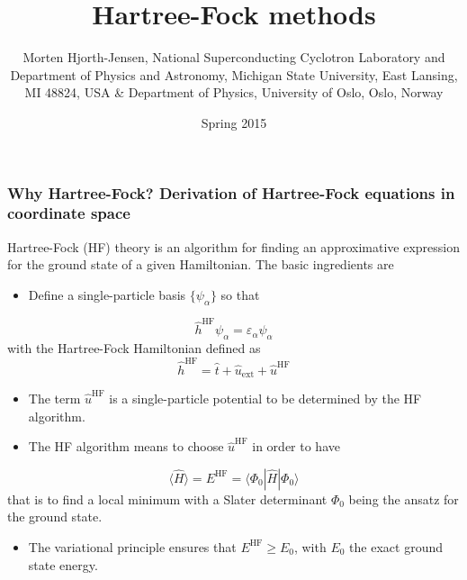 \documentclass{beamer}
\begin{document}




\title{Hartree-Fock methods}


\author{Morten Hjorth-Jensen, National Superconducting Cyclotron Laboratory and Department of Physics and Astronomy, Michigan State University, East Lansing, MI 48824, USA {\&} Department of Physics, University of Oslo, Oslo, Norway\inst{}}
\institute{}

\date{Spring 2015
}

\begin{frame}
\titlepage
\end{frame}

\begin{frame}
\frametitle{Why Hartree-Fock? Derivation of Hartree-Fock equations in coordinate space}

\begin{block}{}
Hartree-Fock (HF) theory is an algorithm for finding an approximative expression for the ground state of a given Hamiltonian. The basic ingredients are
\begin{itemize}
  \item Define a single-particle basis $\{\psi_{\alpha}\}$ so that
\end{itemize}

\noindent
\[ 
\hat{h}^{\mathrm{HF}}\psi_{\alpha} = \varepsilon_{\alpha}\psi_{\alpha}
\]
with the Hartree-Fock Hamiltonian defined as
\[
\hat{h}^{\mathrm{HF}}=\hat{t}+\hat{u}_{\mathrm{ext}}+\hat{u}^{\mathrm{HF}}
\]
\begin{itemize}
  \item The term  $\hat{u}^{\mathrm{HF}}$ is a single-particle potential to be determined by the HF algorithm.

  \item The HF algorithm means to choose $\hat{u}^{\mathrm{HF}}$ in order to have 
\end{itemize}

\noindent
\[ \langle \hat{H} \rangle = E^{\mathrm{HF}}= \langle \Phi_0 | \hat{H}|\Phi_0 \rangle
\]
that is to find a local minimum with a Slater determinant $\Phi_0$ being the ansatz for the ground state. 
\begin{itemize}
  \item The variational principle ensures that $E^{\mathrm{HF}} \ge E_0$, with $E_0$ the exact ground state energy.
\end{itemize}

\noindent
\end{block}
\end{frame}
\end{document}
